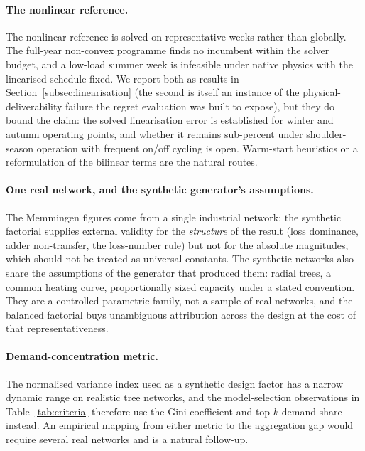 \paragraph{The nonlinear reference.}
The nonlinear reference is solved on representative weeks rather than globally. The
full-year non-convex programme finds no incumbent within the solver budget, and a low-load
summer week is infeasible under native physics with the linearised schedule fixed. We
report both as results in Section~\ref{subsec:linearisation} (the second is itself an
instance of the physical-deliverability failure the regret evaluation was built to expose),
but they do bound the claim: the solved linearisation error is established for winter
and autumn operating points, and whether it remains sub-percent under shoulder-season
operation with frequent on/off cycling is open. Warm-start heuristics or a reformulation
of the bilinear terms are the natural routes.

\paragraph{One real network, and the synthetic generator's assumptions.}
The Memmingen figures come from a single industrial network; the synthetic factorial
supplies external validity for the \emph{structure} of the result (loss dominance,
adder non-transfer, the loss-number rule) but not for the absolute magnitudes, which
should not be treated as universal constants. The synthetic networks also share the
assumptions of the generator that produced them: radial trees, a common heating curve,
proportionally sized capacity under a stated convention. They are a controlled parametric
family, not a sample of real networks, and the balanced factorial buys unambiguous
attribution across the design at the cost of that representativeness.

\paragraph{Demand-concentration metric.}
The normalised variance index used as a synthetic design factor has a narrow dynamic range
on realistic tree networks, and the model-selection observations in
Table~\ref{tab:criteria} therefore use the Gini coefficient and top-$k$ demand share
instead. An empirical mapping from either metric to the aggregation gap would require
several real networks and is a natural follow-up.
